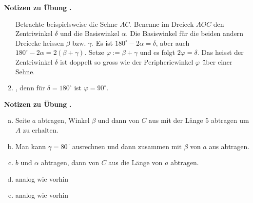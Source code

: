 \documentclass[%
11pt,%
twoside,%
titlepage,%
swissgerman,%
headsepline%
]{scrartcl}
\newcommand{\faReturnGray}{\textcolor{gray}{\faMailReply}} %
\theoremstyle{definition}
\theoremstyle{plain}
\newcommand{\concatueb}[1]{ueb:#1}%
\newcommand{\concatlsg}[1]{lsg:#1}%
\newcounter{uebcounter}[section]
\renewcommand{\theuebcounter}{\thesection.\arabic{uebcounter}}  %
\newenvironment{lsg}[1]{%
    \par\noindent\textbf{Notizen zu Übung \theuebcounter\label{\concatlsg{#1}}}
    \hfill\hyperref[\concatueb{#1}]{\faReturnGray}\par %
}{%
    \par%
}
\begin{document}
\begin{lsg}{testfragen}
\begin{enumerate}
        \begin{center}
        \end{center}

        Betrachte beispielsweise die Sehne $AC$. Benenne im Dreieck $AOC$ den Zentriwinkel $\delta$ und die Basiswinkel $\alpha$. Die Basiswinkel für die beiden andern Dreiecke heissen $\beta$ bzw. $\gamma$. Es ist $180^\circ-2\alpha=\delta$, aber auch $180^\circ-2\alpha=2(\beta+\gamma)$. Setze $\varphi:=\beta+\gamma$ und es folgt $2\varphi=\delta$. Das heisst der Zentriwinkel $\delta$ ist doppelt so gross wie der Peripheriewinkel $\varphi$ über einer Sehne.
        \item {}, denn für $\delta=180^\circ$ ist $\varphi=90^\circ$.
    \end{enumerate}
\end{lsg}
\begin{lsg}{konstruieredreiecke}
    \begin{enumerate}[a)]
        \item Seite $a$ abtragen, Winkel $\beta$ und dann von $C$ aus mit der Länge $5$ abtragen um $A$ zu erhalten.
        \item Man kann $\gamma=80^\circ$ ausrechnen und dann zusammen mit $\beta$ von $a$ aus abtragen.
        \item $b$ und $\alpha$ abtragen, dann von $C$ aus die Länge von $a$ abtragen.
        \item analog wie vorhin
        \item analog wie vorhin
    \end{enumerate}
\end{lsg}
\end{document}
